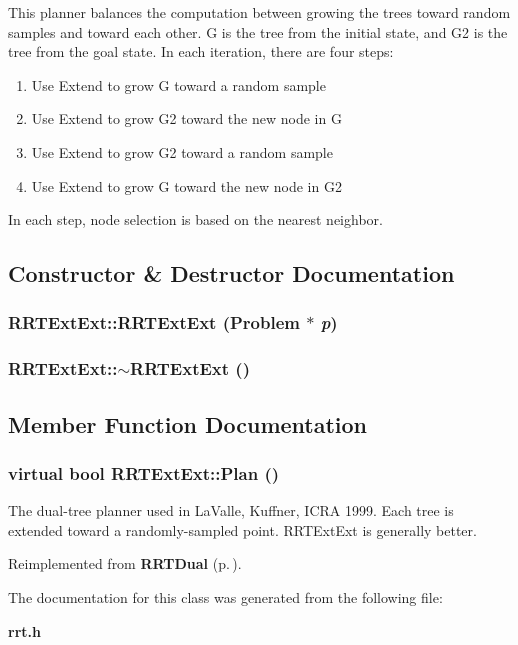 This planner balances the computation between growing the trees toward random samples and toward each other. G is the tree from the initial state, and G2 is the tree from the goal state. In each iteration, there are four steps: \begin{enumerate}
 \item 
Use Extend to grow G toward a random sample \item 
Use Extend to grow G2 toward the new node in G \item 
Use Extend to grow G2 toward a random sample \item 
Use Extend to grow G toward the new node in G2 \end{enumerate}
 In each step, node selection is based on the nearest neighbor. 



\subsection{Constructor \& Destructor Documentation}
\subsubsection{\setlength{\rightskip}{0pt plus 5cm}RRTExt\-Ext::RRTExt\-Ext ({\bf Problem} $\ast$ {\em p})}\label{class_RRTExtExt_a0}


\subsubsection{\setlength{\rightskip}{0pt plus 5cm}RRTExt\-Ext::$\sim$RRTExt\-Ext ()\hspace{0.3cm}{\tt  [inline, virtual]}}\label{class_RRTExtExt_a1}




\subsection{Member Function Documentation}
\subsubsection{\setlength{\rightskip}{0pt plus 5cm}virtual bool RRTExt\-Ext::Plan ()\hspace{0.3cm}{\tt  [virtual]}}\label{class_RRTExtExt_a2}


The dual-tree planner used in La\-Valle, Kuffner, ICRA 1999. Each tree is extended toward a randomly-sampled point. RRTExt\-Ext is generally better.



Reimplemented from {\bf RRTDual} {\rm (p.\,\pageref{class_RRTDual_a2})}.

The documentation for this class was generated from the following file:\begin{CompactItemize}
\item 
{\bf rrt.h}\end{CompactItemize}
